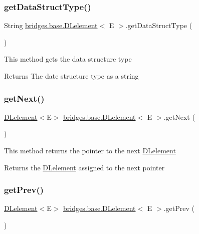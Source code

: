 \subsubsection{\texorpdfstring{get\+Data\+Struct\+Type()}{getDataStructType()}}
{\footnotesize\ttfamily String \hyperlink{classbridges_1_1base_1_1_d_lelement}{bridges.\+base.\+D\+Lelement}$<$ E $>$.get\+Data\+Struct\+Type (\begin{DoxyParamCaption}{ }\end{DoxyParamCaption})}

This method gets the data structure type

\begin{DoxyReturn}{Returns}
The date structure type as a string 
\end{DoxyReturn}
\hypertarget{classbridges_1_1base_1_1_d_lelement_a35e88e8d991d6f23ec63b3ef3f6cce4e}{}\label{classbridges_1_1base_1_1_d_lelement_a35e88e8d991d6f23ec63b3ef3f6cce4e} 
\subsubsection{\texorpdfstring{get\+Next()}{getNext()}}
{\footnotesize\ttfamily \hyperlink{classbridges_1_1base_1_1_d_lelement}{D\+Lelement}$<$E$>$ \hyperlink{classbridges_1_1base_1_1_d_lelement}{bridges.\+base.\+D\+Lelement}$<$ E $>$.get\+Next (\begin{DoxyParamCaption}{ }\end{DoxyParamCaption})}

This method returns the pointer to the next \hyperlink{classbridges_1_1base_1_1_d_lelement}{D\+Lelement}

\begin{DoxyReturn}{Returns}
the \hyperlink{classbridges_1_1base_1_1_d_lelement}{D\+Lelement} assigned to the next pointer 
\end{DoxyReturn}
\hypertarget{classbridges_1_1base_1_1_d_lelement_a859f08f38513ecdfff0eb11bd2b98ce7}{}\label{classbridges_1_1base_1_1_d_lelement_a859f08f38513ecdfff0eb11bd2b98ce7} 
\subsubsection{\texorpdfstring{get\+Prev()}{getPrev()}}
{\footnotesize\ttfamily \hyperlink{classbridges_1_1base_1_1_d_lelement}{D\+Lelement}$<$E$>$ \hyperlink{classbridges_1_1base_1_1_d_lelement}{bridges.\+base.\+D\+Lelement}$<$ E $>$.get\+Prev (\begin{DoxyParamCaption}{ }\end{DoxyParamCaption})}

